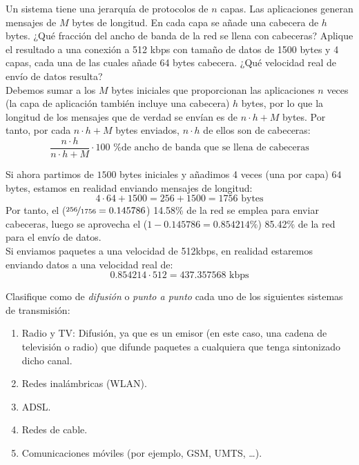 \begin{ejercicio}
 Un sistema tiene una jerarquía de protocolos de $n$ capas. Las aplicaciones generan mensajes de $M$ bytes de longitud. En cada capa se añade una cabecera de $h$ bytes. ¿Qué fracción del ancho de banda de la red se llena con cabeceras? Aplique el resultado a una conexión a 512 kbps con tamaño de datos de 1500 bytes y 4 capas, cada una de las cuales añade 64 bytes cabecera. ¿Qué velocidad real de envío de datos resulta?\\

 Debemos sumar a los $M$ bytes iniciales que proporcionan las aplicaciones $n$ veces (la capa de aplicación también incluye una cabecera) $h$ bytes, por lo que la longitud de los mensajes que de verdad se envían es de $n\cdot h + M$ bytes. Por tanto, por cada $n\cdot h + M$ bytes enviados, $n\cdot h$ de ellos son de cabeceras:
 \begin{equation*}
     \dfrac{n\cdot h}{n\cdot h + M}\cdot 100 \text{\ \ \% de ancho de banda que se llena de cabeceras}
 \end{equation*}

 Si ahora partimos de $1500$ bytes iniciales y añadimos 4 veces (una por capa) $64$ bytes, estamos en realidad enviando mensajes de longitud:
 \begin{equation*}
     4\cdot 64 + 1500 = 256 + 1500 = 1756 \text{\ bytes}
 \end{equation*}
 Por tanto, el ($\nicefrac{256}{1756} = 0.145786$) 14.58\% de la red se emplea para enviar cabeceras, luego se aprovecha el ($1-0.145786 = 0.854214\%$) 85.42\% de la red para el envío de datos.\\

 Si enviamos paquetes a una velocidad de 512kbps, en realidad estaremos enviando datos a una velocidad real de:
 \begin{equation*}
     0.854214 \cdot 512 = 437.357568 \text{\ kbps}
 \end{equation*}
\end{ejercicio}

\begin{ejercicio} %
    Clasifique como de \textit{difusión} o \textit{punto a punto} cada uno de los siguientes sistemas de transmisión:
    \begin{enumerate}[label=\alph*.]
        \item Radio y TV\@: Difusión, ya que es un emisor (en este caso, una cadena de televisión o radio) que difunde paquetes a cualquiera que tenga sintonizado dicho canal.
        \item Redes inalámbricas (WLAN).
        \item ADSL\@.
        \item Redes de cable.
        \item Comunicaciones móviles (por ejemplo, GSM, UMTS, \ldots).
    \end{enumerate}
\end{ejercicio}

